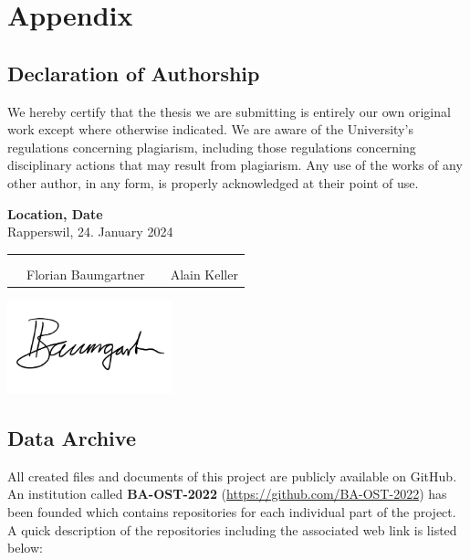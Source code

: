 \chapter{Appendix}
\clearpage

\section{Declaration of Authorship} \label{Declaration of Authorship}
We hereby certify that the thesis we are submitting is entirely our own original work except where otherwise indicated. We are aware of the University’s regulations concerning plagiarism, including those regulations concerning disciplinary actions that may result from plagiarism. Any use of the works of any other author, in any form, is properly acknowledged at their point of use.

\bigskip
\textbf{Location, Date} \\
Rapperswil, 24. January 2024

\vspace{1.2cm}
\begin{tabular}{@{}p{0.1cm}p{6cm}p{0.6cm}p{6cm}@{}}
	 & \hrulefill          &  & \hrulefill   \\ \\[-0.7em]
	 & Florian Baumgartner &  & Alain Keller \\
\end{tabular}

\includegraphics[width=4.8cm, align=t, smash=br, hshift=0.9cm, vshift=2.55cm]{appendix/Signature_Florian_Baumgartner.pdf}
\newpage

\section{Data Archive} \label{Data Archive}
All created files and documents of this project are publicly available on GitHub. An institution called \textbf{BA-OST-2022} (\url{https://github.com/BA-OST-2022}) has been founded which contains repositories for each individual part of the project.
A quick description of the repositories including the associated web link is listed below:

